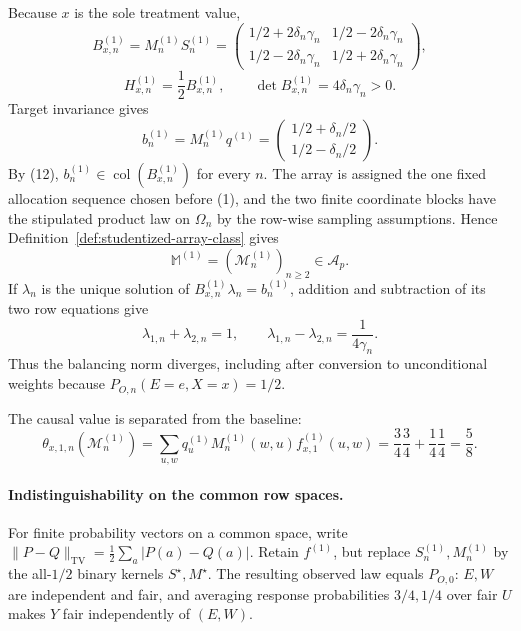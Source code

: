 Because \(x\) is the sole treatment value,
\[
B^{(1)}_{x,n}=M^{(1)}_nS^{(1)}_n
=\begin{pmatrix}
1/2+2\delta_n\gamma_n&1/2-2\delta_n\gamma_n\\
1/2-2\delta_n\gamma_n&1/2+2\delta_n\gamma_n
\end{pmatrix},
\tag{11}
\]
\[
H^{(1)}_{x,n}=\frac12B^{(1)}_{x,n},
\qquad
\det B^{(1)}_{x,n}=4\delta_n\gamma_n>0.
\tag{12}
\]
Target invariance gives
\[
b^{(1)}_n=M^{(1)}_nq^{(1)}
=\begin{pmatrix}1/2+\delta_n/2\\1/2-\delta_n/2\end{pmatrix}.
\tag{13}
\]
By (12), \(b^{(1)}_n\in\operatorname{col}(B^{(1)}_{x,n})\) for every \(n\).  The array is assigned the one fixed allocation sequence chosen before (1), and the two finite coordinate blocks have the stipulated product law on \(\Omega_n\) by the row-wise sampling assumptions.  Hence Definition~\ref{def:studentized-array-class} gives
\[
\mathbb M^{(1)}=(\mathcal M^{(1)}_n)_{n\ge2}\in\mathcal A_p.
\tag{14}
\]
If \(\lambda_n\) is the unique solution of \(B^{(1)}_{x,n}\lambda_n=b^{(1)}_n\), addition and subtraction of its two row equations give
\[
\lambda_{1,n}+\lambda_{2,n}=1,
\qquad
\lambda_{1,n}-\lambda_{2,n}=\frac1{4\gamma_n}.
\tag{15}
\]
Thus the balancing norm diverges, including after conversion to unconditional weights because \(P_{O,n}(E=e,X=x)=1/2\).

The causal value is separated from the baseline:
\[
\theta_{x,1,n}(\mathcal M^{(1)}_n)
=\sum_{u,w}q^{(1)}_uM^{(1)}_n(w,u)f^{(1)}_{x,1}(u,w)
=\frac34\frac34+\frac14\frac14
=\frac58.
\tag{16}
\]

\paragraph{Indistinguishability on the common row spaces.}
For finite probability vectors on a common space, write \(\lVert P-Q\rVert_{\mathrm{TV}}=\frac12\sum_a|P(a)-Q(a)|\).  Retain \(f^{(1)}\), but replace \(S^{(1)}_n,M^{(1)}_n\) by the all-\(1/2\) binary kernels \(S^{\star},M^{\star}\).  The resulting observed law equals \(P_{O,0}\): \(E,W\) are independent and fair, and averaging response probabilities \(3/4,1/4\) over fair \(U\) makes \(Y\) fair independently of \((E,W)\).

